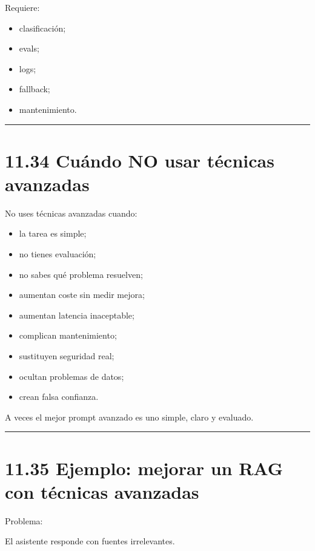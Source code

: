 Requiere:

\begin{itemize}
\tightlist
\item
  clasificación;
\item
  evals;
\item
  logs;
\item
  fallback;
\item
  mantenimiento.
\end{itemize}

\begin{center}\rule{0.5\linewidth}{0.5pt}\end{center}

\section{11.34 Cuándo NO usar técnicas
avanzadas}\label{cuuxe1ndo-no-usar-tuxe9cnicas-avanzadas}

No uses técnicas avanzadas cuando:

\begin{itemize}
\tightlist
\item
  la tarea es simple;
\item
  no tienes evaluación;
\item
  no sabes qué problema resuelven;
\item
  aumentan coste sin medir mejora;
\item
  aumentan latencia inaceptable;
\item
  complican mantenimiento;
\item
  sustituyen seguridad real;
\item
  ocultan problemas de datos;
\item
  crean falsa confianza.
\end{itemize}

A veces el mejor prompt avanzado es uno simple, claro y evaluado.

\begin{center}\rule{0.5\linewidth}{0.5pt}\end{center}

\section{11.35 Ejemplo: mejorar un RAG con técnicas
avanzadas}\label{ejemplo-mejorar-un-rag-con-tuxe9cnicas-avanzadas}

Problema:

El asistente responde con fuentes irrelevantes.

